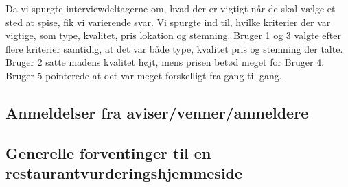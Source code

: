\documentclass[a4paper, 12pt]{article}
\begin{document}
  Da vi spurgte interviewdeltagerne om, hvad der er vigtigt når de skal vælge et
  sted at spise, fik vi varierende svar. Vi spurgte ind til, hvilke kriterier
  der var vigtige, som type, kvalitet, pris lokation og stemning. Bruger 1 og 3
  valgte efter flere kriterier samtidig, at det var både type, kvalitet
  pris og stemning der talte. Bruger 2 satte madens kvalitet højt, mens prisen
  betød meget for Bruger 4. Bruger 5 pointerede at det var meget forskelligt fra
  gang til gang.


\subsection{Anmeldelser fra aviser/venner/anmeldere}



\subsection{Generelle forventinger til en restaurantvurderingshjemmeside}
\end{document}
